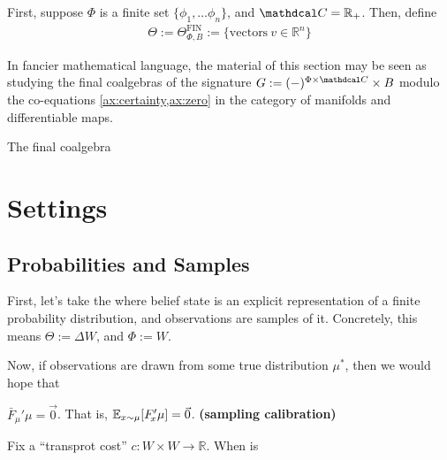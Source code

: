 \documentclass{article}
\def\confdom{\mathdcal C}
\def\Rplus{\mathbb R_+}
\begin{document}
First, suppose $\Phi$ is a finite set $\{ \phi_1, \ldots \phi_n\}$, and $\confdom = \Rplus$. 
Then, define
\begin{align*}
	\Theta := \Theta^{\text{FIN}}_{\Phi, B} := 
		\Big\{ \text{vectors}~ v \in \mathbb R^n \Big\}
\end{align*}





In fancier mathematical language, the material of this section may be seen as studying the final coalgebras of the signature 
$
	G := (-)^{\Phi \times \confdom} \times B
$
modulo the co-equations \cref{ax:certainty,ax:zero} in the category of manifolds and differentiable maps.


\begin{prop}
	The final coalgebra 	
\end{prop}


\section{Settings}
\subsection{Probabilities and Samples}

First, let's take the where belief state is an explicit representation of a finite probability distribution, and observations are samples of it. 
Concretely, this means $\Theta := \Delta W$, and $\Phi := W$. 

Now, if observations are drawn from some true distribution $\mu^*$, then we would hope that 

\begin{CFaxioms}
	\item  $\bar F_{\!\mu}'\mu = \vec 0$. 
	That is, $\operatorname*{\mathbb{E}}_{x \sim \mu}[ F'_{\!x}\mu] = \vec 0$.
	\hfill \textbf{(sampling calibration)} \label{ax:sample-calibration}
\end{CFaxioms}

\begin{computation}
    Fix a ``transprot cost'' $c : W\times W \to \mathbb R$. 
    When is 
    \tcblower
\end{computation}
\end{document}
